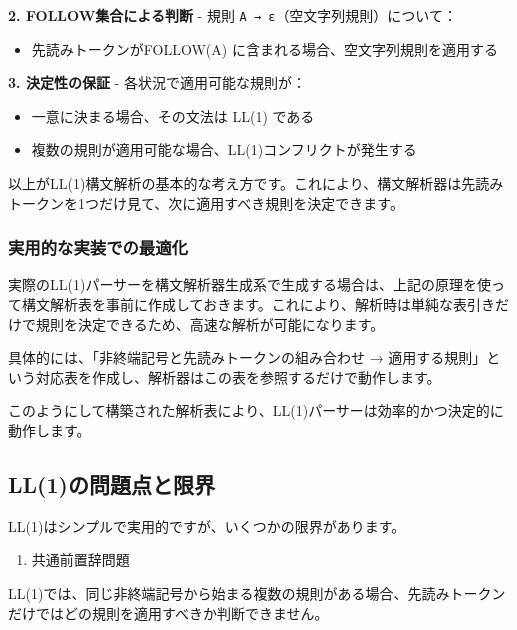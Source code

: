 \textbf{2. FOLLOW集合による判断} - 規則 \texttt{A\ →\ ε}（空文字列規則）について：
\begin{itemize}
\item 先読みトークンがFOLLOW(A) に含まれる場合、空文字列規則を適用する
\end{itemize}

\textbf{3. 決定性の保証} - 各状況で適用可能な規則が：
\begin{itemize}
\item 一意に決まる場合、その文法は LL(1) である
\item 複数の規則が適用可能な場合、LL(1)コンフリクトが発生する
\end{itemize}

以上がLL(1)構文解析の基本的な考え方です。これにより、構文解析器は先読みトークンを1つだけ見て、次に適用すべき規則を決定できます。

\hypertarget{chapter5-ux5b9fux7528ux7684ux306aux5b9fux88c5ux3067ux306eux6700ux9069ux5316}{%
\subsubsection{実用的な実装での最適化}\label{chapter5-ux5b9fux7528ux7684ux306aux5b9fux88c5ux3067ux306eux6700ux9069ux5316}}

実際のLL(1)パーサーを構文解析器生成系で生成する場合は、上記の原理を使って構文解析表を事前に作成しておきます。これにより、解析時は単純な表引きだけで規則を決定できるため、高速な解析が可能になります。

具体的には、「非終端記号と先読みトークンの組み合わせ →
適用する規則」という対応表を作成し、解析器はこの表を参照するだけで動作します。

このようにして構築された解析表により、LL(1)パーサーは効率的かつ決定的に動作します。

\hypertarget{chapter5-ll1ux306eux554fux984cux70b9ux3068ux9650ux754c}{%
\subsection{LL(1)の問題点と限界}\label{chapter5-ll1ux306eux554fux984cux70b9ux3068ux9650ux754c}}

LL(1)はシンプルで実用的ですが、いくつかの限界があります。

\begin{enumerate}
\def\labelenumi{\arabic{enumi}.}
\tightlist
\item
  共通前置辞問題
\end{enumerate}

LL(1)では、同じ非終端記号から始まる複数の規則がある場合、先読みトークンだけではどの規則を適用すべきか判断できません。

